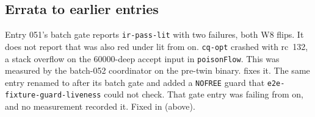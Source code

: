 \subsection*{Errata to earlier entries}
Entry 051's batch gate reports \texttt{ir-pass-lit} with two failures, both W8 flips. It does not report that  was also red under lit from  on. \texttt{cq-opt} crashed with rc~132, a stack overflow on the 60000-deep accept input in \texttt{poisonFlow}. This was measured by the batch-052 coordinator on the pre-twin binary.  fixes it. The same entry renamed  to  after its batch gate and added a \texttt{NOFREE} guard that \texttt{e2e-fixture-guard-liveness} could not check. That gate entry was failing from  on, and no measurement recorded it. Fixed in  (above).
